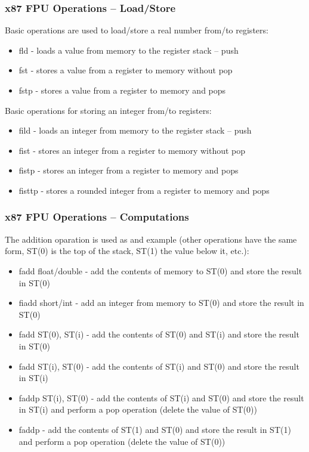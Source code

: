 \documentclass{beamer}
\begin{document}
\begin{frame}
\frametitle{x87 FPU Operations -- Load/Store}

Basic operations are used to load/store a real number from/to registers:
\begin{itemize}
\item fld - loads a value from memory to the register stack -- push
\item fst - stores a value from a register to memory without pop
\item fstp - stores a value from a register to memory and pops
\end{itemize}
Basic operations for storing an integer from/to registers:
\begin{itemize}
\item fild - loads an integer from memory to the register stack -- push
\item fist - stores an integer from a register to memory without pop
\item fistp - stores an integer from a register to memory and pops
\item fisttp - stores a rounded integer from a register to memory and pops
\end{itemize}
\end{frame}

\begin{frame}
\frametitle{x87 FPU Operations -- Computations}
The addition oparation is used as and example (other operations have the same form, ST(0) is the top of the stack, ST(1) the value below it, etc.):
\begin{itemize}
\item fadd float/double - add the contents of memory to ST(0) and store the result in ST(0)
\item fiadd short/int - add an integer from memory to ST(0) and store the result in ST(0)
\item fadd ST(0), ST(i) - add the contents of ST(0) and ST(i) and store the result in ST(0)
\item fadd ST(i), ST(0) - add the contents of ST(i) and ST(0) and store the result in ST(i)
\item faddp ST(i), ST(0) - add the contents of ST(i) and ST(0) and store the result in ST(i) and perform a pop operation (delete the value of ST(0))
\item faddp - add the contents of ST(1) and ST(0) and store the result in ST(1) and perform a pop operation (delete the value of ST(0))
\end{itemize}
\end{frame}
\end{document}
